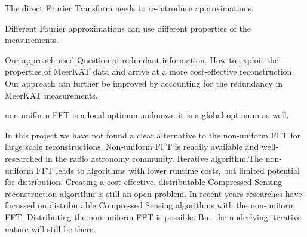 The direct Fourier Transform needs to re-introduce approximations.
 
Different Fourier approximations can use different properties of the measurements.

Our approach used 
Question of redundant information.
How to exploit the properties of MeerKAT data and arrive at a more cost-effective reconstruction. Our approach can further be improved by accounting for the redundancy in MeerKAT measurements.

non-uniform FFT is a local optimum.unknown it is a global optimum as well.


In this project we have not found a clear alternative to the non-uniform FFT for large scale reconstructions. Non-uniform FFT is readily available and well-researched in the radio astronomy community. Iterative algorithm.The non-uniform FFT leads to algorithms with lower runtime costs, but limited potential for distribution. Creating a cost effective, distributable Compressed Sensing reconstruction algorithm is still an open problem. 
In recent years researches have focussed on distributable Compressed Sensing algorithms\cite{dabbech2018cygnus, pratley2018fast} with the non-uniform FFT.
Distributing the non-uniform FFT is possible\cite{kunisnonequispaced}. But the underlying iterative nature will still be there.












